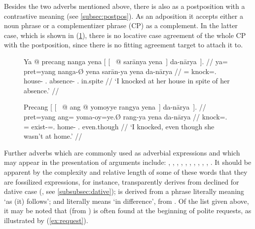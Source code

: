 Besides the two adverbs mentioned above, there is also
 as a postposition
with a contrastive meaning (see \autoref{subsec:postpos}). As an adposition it
accepts either a noun phrase or a complementizer phrase (CP) as a complement.
In the latter case, which is shown in (\ref{ex:danaarya2}), there is no
locative case agreement of the whole CP with the postposition, since there is
no fitting agreement target to attach it to.

\begin{figure}
\pex\label{ex:danaarya}
\a\label{ex:danaarya1}\begingl[glspace=.25em]
	\gla Ya @ precang nanga yena \textup{[ [~} @ sarānya 
		yena~\textup{]} da-nārya~\textup{]}. //
	\glb ya= pret=yang nanga-Ø yena {} sarān-ya yena da-nārya //
	\glc \LocT{}= knock=\Fsg{}.\Aarg{} house-\Top{} \TsgF{}.\Gen{} {}
		absence-\Loc{} \TsgF{}.\Gen{} in.spite //
	\glft `I knocked at her house in spite of her absence.' //
\endgl

\a\label{ex:danaarya2}\begingl
	\gla Precang \textup{[ [~} @ ang @ yomoyye rangya 
		yena~\textup{]} da-nārya~\textup{]}. //
	\glb pret=yang {} ang= yoma-oy=ye.Ø rang-ya yena da-nārya //
	\glc knock=\Fsg{}.\Aarg{} {} \AgtT{}= exist-\Neg{}=\TsgF{}.\Top{} 
		home-\Loc{} \TsgF{}.\Gen{} even.though //
	\glft `I knocked, even though she wasn't at home.' //
\endgl
\xe
\end{figure}

Further adverbs which are commonly used as adverbial expressions and which may 
appear in the presentation of arguments include:
,
,
,
,
,
,
,
,
,
,
.
It should be apparent by the complexity and relative length of some of these 
words that they are fossilized expressions, for instance, 
 transparently derives from 
 declined for dative case 
(, see \autoref{subsubsec:dative}); 
 is derived from a phrase literally meaning `as 
(it) follows'; and  literally 
means `in difference', from . Of the list given above, it may be noted that 
 (from ) is often found 
at the beginning of polite requests, as illustrated by (\ref{ex:request}).

